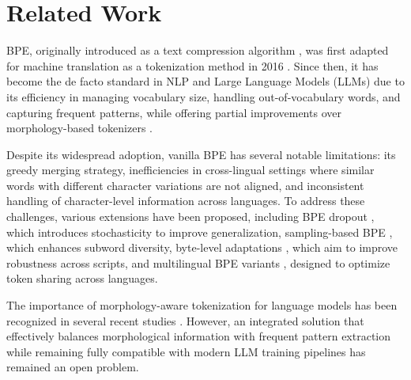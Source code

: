 \section{Related Work}
BPE, originally introduced as a text compression algorithm \citep{shibata1999byte}, was first adapted for machine translation as a tokenization method in 2016 \citep{sennrich-etal-2016-neural}. Since then, it has become the de facto standard in NLP and Large Language Models (LLMs) due to its efficiency in managing vocabulary size, handling out-of-vocabulary words, and capturing frequent patterns, while offering partial improvements over morphology-based tokenizers \citep{sennrich-etal-2016-neural}.  

Despite its widespread adoption, vanilla BPE has several notable limitations: its greedy merging strategy, inefficiencies in cross-lingual settings where similar words with different character variations are not aligned, and inconsistent handling of character-level information across languages. To address these challenges, various extensions have been proposed, including BPE dropout \citep{provilkov-etal-2020-bpe}, which introduces stochasticity to improve generalization, sampling-based BPE \citep{asgari2019probabilistic, asgari2020subword}, which enhances subword diversity, byte-level adaptations \citep{wang2020neural}, which aim to improve robustness across scripts, and multilingual BPE variants \citep{liang-etal-2023-xlm}, designed to optimize token sharing across languages.  

The importance of morphology-aware tokenization for language models has been recognized in several recent studies \citep{park-etal-2021-morphology, jabbar2023morphpiece, marco-fraser-2024-subword, weller-di-marco-fraser-2024-analyzing}. However, an integrated solution that effectively balances morphological information with frequent pattern extraction while remaining fully compatible with modern LLM training pipelines has remained an open problem.
